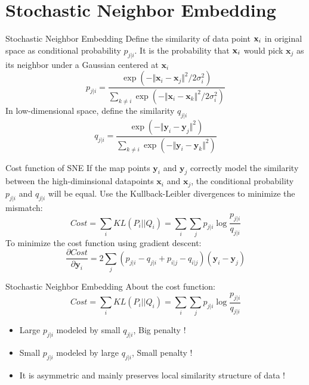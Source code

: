 \documentclass[10pt]{beamer}
\newcommand{\bol}[1]{\textbf{#1}}
\begin{document}
\section{Stochastic Neighbor Embedding}
\begin{frame}{Stochastic Neighbor Embedding}
Define the similarity of data point $\bold{x}_i$ in original space as conditional probability $p_{j|i}$. It is the probability that $\bold{x}_i$ would pick $\bol{x}_j$ as its neighbor under a Gaussian centered at $\bol{x}_i$
\begin{displaymath}
	p_{j|i} = \frac{\exp{(-\Vert\bol{x}_i - \bol{x}_j\Vert^2 / 2\sigma_i^2)}}{\sum_{k \neq i}\exp(-\Vert\bol{x}_i - \bol{x}_k\Vert^2 / 2\sigma_i^2)}
\end{displaymath}
In low-dimensional space, define the similarity $q_{j|i}$
\begin{displaymath}
	q_{j|i} = \frac{\exp{(-\Vert\bol{y}_i - \bol{y}_j\Vert^2)}}{\sum_{k \neq i}\exp(-\Vert\bol{y}_i - \bol{y}_k\Vert^2)}
\end{displaymath}
\end{frame}

\begin{frame}{Cost function of SNE}
If the map points $\bol{y}_i$ and $\bol{y}_j$ correctly model the similarity between the high-diminsional datapoints $\bol{x}_i$ and $\bol{x}_j$, the conditional probability $p_{j|i}$ and $q_{j|i}$ will be equal. Use the Kullback-Leibler divergences to minimize the mismatch:
\begin{displaymath}
	Cost = \sum_i KL(P_i||Q_i) = \sum_i\sum_j p_{j|i} \log\frac{p_{j|i}}{q_{j|i}}
\end{displaymath}
To minimize the cost function using gradient descent:
\begin{displaymath}
	\frac{\partial Cost}{\partial \bol{y}_i} = 2\sum_j (p_{j|i} - q_{j|i} + p_{i|j} - q_{i|j})(\bol{y}_i - \bol{y}_j)
\end{displaymath}
\end{frame}


\begin{frame}{Stochastic Neighbor Embedding}
About the cost function:
\begin{displaymath}
	Cost = \sum_i KL(P_i||Q_i) = \sum_i\sum_j p_{j|i} \log\frac{p_{j|i}}{q_{j|i}}
\end{displaymath}
\begin{itemize}
	\item Large $p_{j|i}$ modeled by small $q_{j|i}$, Big penalty !
	\item Small $p_{j|i}$ modeled by large $q_{j|i}$, Small penalty ! 
	\item It is asymmetric and mainly preserves local similarity structure of data !
\end{itemize}
\end{frame}
\end{document}
